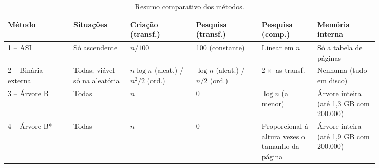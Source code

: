 \documentclass{article}
\begin{document}
\begin{table}[!htb]
    \centering
    \footnotesize
    \begin{tabular}{|p{0.15\linewidth}|p{0.13\linewidth}|p{0.15\linewidth}|p{0.15\linewidth}|p{0.12\linewidth}|p{0.14\linewidth}|}
        \hline\hline
        Método & Situações & Criação (transf.) & Pesquisa (transf.) & Pesquisa (comp.) & Memória interna \\\hline
        1 -- ASI & Só ascendente & $n/100$ & 100 (constante) & Linear em $n$ & Só a tabela de páginas \\\hline
        2 -- Binária externa & Todas; viável só na aleatória & $n \log n$ (aleat.) / $n^2/2$ (ord.) & $\log n$ (aleat.) / $n/2$ (ord.) & $2\times$ as transf. & Nenhuma (tudo em disco) \\\hline
        3 -- Árvore B & Todas & $n$ & 0 & $\log n$ (a menor) & Árvore inteira (até 1,3 GB com 200.000) \\\hline
        4 -- Árvore B* & Todas & $n$ & 0 & Proporcional à altura vezes o tamanho da página & Árvore inteira (até 1,9 GB com 200.000) \\\hline\hline
    \end{tabular}
    \caption{\label{tab:resumo}Resumo comparativo dos métodos.}
\end{table}
\end{document}
